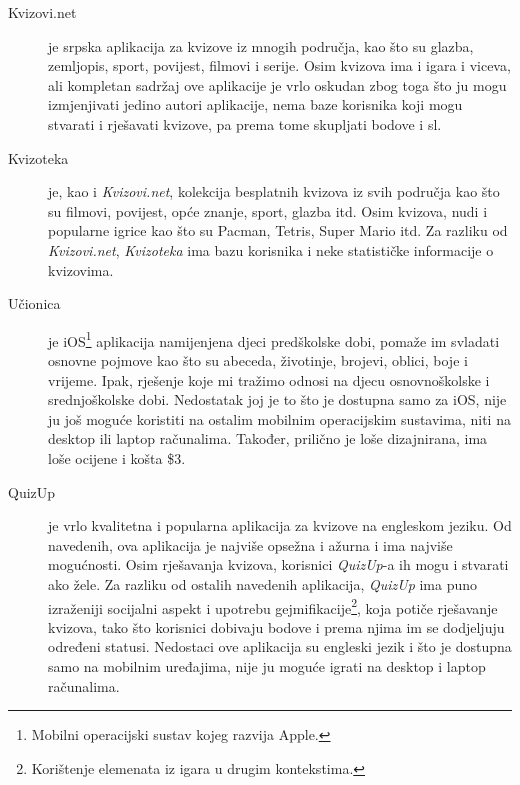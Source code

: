 \documentclass[11pt]{scrreprt}
\begin{document}
\begin{description}

  \item[Kvizovi.net] je srpska aplikacija za kvizove iz mnogih područja, kao što
    su glazba, zemljopis, sport, povijest, filmovi i serije. Osim kvizova ima i
    igara i viceva, ali kompletan sadržaj ove aplikacije je vrlo oskudan zbog
    toga što ju mogu izmjenjivati jedino autori aplikacije, nema baze korisnika
    koji mogu stvarati i rješavati kvizove, pa prema tome skupljati bodove i
    sl.\cite{kvizovinet}

  \item[Kvizoteka] je, kao i \emph{Kvizovi.net}, kolekcija besplatnih kvizova iz
    svih područja kao što su filmovi, povijest, opće znanje, sport, glazba itd.
    Osim kvizova, nudi i popularne igrice kao što su Pacman, Tetris, Super Mario
    itd. Za razliku od \emph{Kvizovi.net}, \emph{Kvizoteka} ima bazu korisnika i
    neke statističke informacije o kvizovima.\cite{kvizoteka}

  \item[Učionica] je iOS\footnote{Mobilni operacijski sustav kojeg razvija
    Apple.} aplikacija namijenjena djeci predškolske dobi, pomaže im svladati
    osnovne pojmove kao što su abeceda, životinje, brojevi, oblici, boje i
    vrijeme. Ipak, rješenje koje mi tražimo odnosi na djecu osnovnoškolske i
    srednjoškolske dobi. Nedostatak joj je to što je dostupna samo za iOS, nije
    ju još moguće koristiti na ostalim mobilnim operacijskim sustavima, niti na
    desktop ili laptop računalima. Također, prilično je loše dizajnirana, ima
    loše ocijene i košta \$3.\cite{ucionica}

  \item[QuizUp] je vrlo kvalitetna i popularna aplikacija za kvizove na
    engleskom jeziku. Od navedenih, ova aplikacija je najviše opsežna i ažurna i
    ima najviše mogućnosti. Osim rješavanja kvizova, korisnici \emph{QuizUp}-a
    ih mogu i stvarati ako žele. Za razliku od ostalih navedenih aplikacija,
    \emph{QuizUp} ima puno izraženiji socijalni aspekt i upotrebu
    gejmifikacije\footnote{Korištenje elemenata iz igara u drugim kontekstima.},
    koja potiče rješavanje kvizova, tako što korisnici dobivaju bodove i prema
    njima im se dodjeljuju određeni statusi. Nedostaci ove aplikacija su
    engleski jezik i što je dostupna samo na mobilnim uređajima, nije ju moguće
    igrati na desktop i laptop računalima.\cite{quizup}

\end{description}
\end{document}
